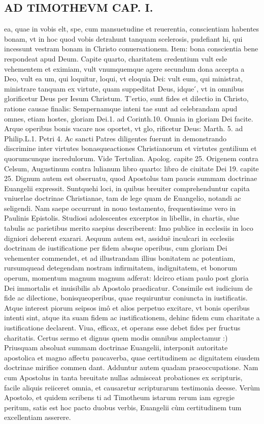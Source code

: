 \documentclass{article}
\begin{document}
\begin{pages}
\section*{AD TIMOTHEVM CAP. I. }
\marginpar{[ p.48 ]}\pstart ea, quae in vobis elt, spe, cum mansuetudine et reuerentia, conscientiam habentes bonam, vt in hoc quod vobis detrahunt tanquam scelerosis, pudefiant hi, qui incessunt   vestram bonam in Christo conuersationem. Item: bona conscientia bene respondeat apud Deum. Capite quarto, charitatem credentium vult esle vehementem et eximiam, vult vnumquemque agere secundum dona accepta a Deo, vult ea um, qui loquitur, loqui, vt eloquia Dei: vult eum, qui ministrat, ministrare tanquam ex virtute, quam suppeditat Deus, idque ́, vt in omnibus glorificetur Deus per Iesum Christum.  \pend\pstart T'ertio, sunt fides et dilectio in Christo, ratione causae finalis: Sempernamque  inteni tae sunt ad celebrandam apud omnes, etiam hostes, gloriam Dei.1. ad Corinth.10. Omnia in gloriam Dei facite. Arque operibus bonis vacare nos oportet, vt glo, rificetur Deus: Marth. 5. ad Philip.L.1. Petri 4. Ac sancti Patres diligentes fuerunt in demonstrando discrimine inter virtutes bonasqueactiones Christianorum et virtutes gentilium et quorumcunque incredulorum. Vide Tertulian. Apolog. capite 25. Origenem contra Celsum, Augustinum contra lulianum libro quarto: libro de ciuitate Dei 19. capite 25. Dignum autem est obseruatu, quod Apostolus tam paucis summam doctrinae Euangelii expressit. Suntquehi loci, in quibus breuiter comprehenduntur capita vniuerlae doctrinae Christianae, tam de lege quam de Euangelio, notandi ac seligendi. Nam saepe occurrunt in nouo testamento, frequentissime vero in Paulinis Epistolis. Studiosi adolescentes excerptos in libellis, in chartis, slue tabulis ac parietibus merito saepius describerent: Imo publice in ecclesiis in loco digniori deberent exarari. Aequum autem est, assiduë inculcari in ecclesiis doctrinam de iustificatione per fidem absque  operibus, cum gloriam Dei vehementer commendet, et ad illustrandam illius bonitatem ac potentiam, rursumquead detegendam nostram infirmitatem, indignitatem, et bonorum operum, momentum magnum magnum adferat: ldcirco etiam paulo post gloria Dei immortalis et inuisibilis ab Apostolo praedicatur. Consimile est iudicium de fide ac dilectione, bonisqueoperibus, quae requiruntur coniuncta in iustificatis. Atque  interest piorum seipsos imô et alios perpetuo excitare, vt bonis operibus intenti sint, atque ita suam fidem ac iustificationem, dehinc fidem cum charitate a iustificatione declarent. Viua, efficax, et operans esse debet fides per fructus charitatis.  \pend\pstart Certus sermo et dignus quem modis omnibus amplectamur :) Priusquam absoluat summam doctrinae Euangelii, interponit autoritate apostolica et magno affectu paucaverba, quae certitudinem ac dignitatem eiusdem doctrinae mirifice commen dant. Adduntur autem quadam praeoccupatione. Nam cum Apostolus in tanta breuitate nullas admisceat probationes ex scripturis, facile aliquis reiiceret omnia, et causaretur scripturarum testimonia deesse. Verùm Apostolo, et quidem scribens ti ad Timotheum istarum rerum iam egregie peritum, satis est hoc pacto duobus verbis, Euangelii cùm certitudinem tum excellentiam asserere. 
\end{pages}
\end{document}
